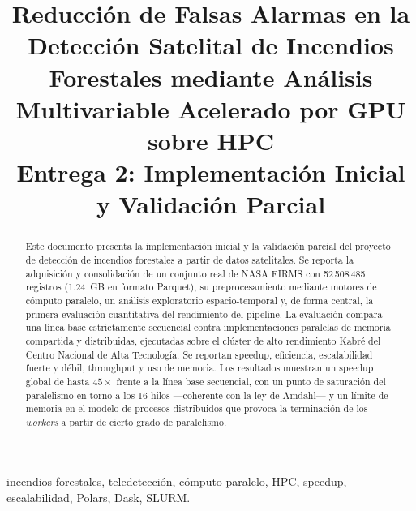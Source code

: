 \documentclass[conference]{IEEEtran}
\begin{document}
\title{Reducción de Falsas Alarmas en la Detección Satelital de Incendios Forestales mediante Análisis Multivariable Acelerado por GPU sobre HPC\\
\large{Entrega 2: Implementación Inicial y Validación Parcial}}

\author{
}

\maketitle

\begin{abstract}
Este documento presenta la implementación inicial y la validación parcial del proyecto de detección de incendios forestales a partir de datos satelitales. Se reporta la adquisición y consolidación de un conjunto real de NASA FIRMS con 52\,508\,485 registros (1.24~GB en formato Parquet), su preprocesamiento mediante motores de cómputo paralelo, un análisis exploratorio espacio-temporal y, de forma central, la primera evaluación cuantitativa del rendimiento del pipeline. La evaluación compara una línea base estrictamente secuencial contra implementaciones paralelas de memoria compartida y distribuidas, ejecutadas sobre el clúster de alto rendimiento Kabré del Centro Nacional de Alta Tecnología. Se reportan speedup, eficiencia, escalabilidad fuerte y débil, throughput y uso de memoria. Los resultados muestran un speedup global de hasta $45\times$ frente a la línea base secuencial, con un punto de saturación del paralelismo en torno a los 16 hilos —coherente con la ley de Amdahl— y un límite de memoria en el modelo de procesos distribuidos que provoca la terminación de los \textit{workers} a partir de cierto grado de paralelismo.
\end{abstract}

\begin{IEEEkeywords}
incendios forestales, teledetección, cómputo paralelo, HPC, speedup, escalabilidad, Polars, Dask, SLURM.
\end{IEEEkeywords}
\end{document}
